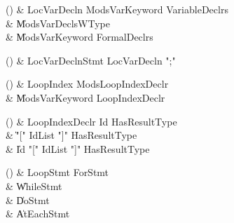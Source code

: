 \begin{bbgrammarappendix}

() & LocVarDecln \label{prod:LocVarDecln}  \: Mods\opt VarKeyword VariableDeclrs  \\

 &    \| Mods\opt VarDeclsWType \\
 &    \| Mods\opt VarKeyword FormalDeclrs \\

\end{bbgrammarappendix}

\begin{bbgrammarappendix}

() & LocVarDeclnStmt \label{prod:LocVarDeclnStmt}  \: LocVarDecln \xcd";"  \\


\end{bbgrammarappendix}

\begin{bbgrammarappendix}

() & LoopIndex \label{prod:LoopIndex}  \: Mods\opt LoopIndexDeclr  \\

 &    \| Mods\opt VarKeyword LoopIndexDeclr \\

\end{bbgrammarappendix}

\begin{bbgrammarappendix}

() & LoopIndexDeclr \label{prod:LoopIndexDeclr}  \: Id HasResultType\opt  \\

 &    \| \xcd"[" IdList \xcd"]" HasResultType\opt \\
 &    \| Id \xcd"[" IdList \xcd"]" HasResultType\opt \\

\end{bbgrammarappendix}

\begin{bbgrammarappendix}

() & LoopStmt \label{prod:LoopStmt}  \: ForStmt  \\

 &    \| WhileStmt \\
 &    \| DoStmt \\
 &    \| AtEachStmt \\

\end{bbgrammarappendix}

